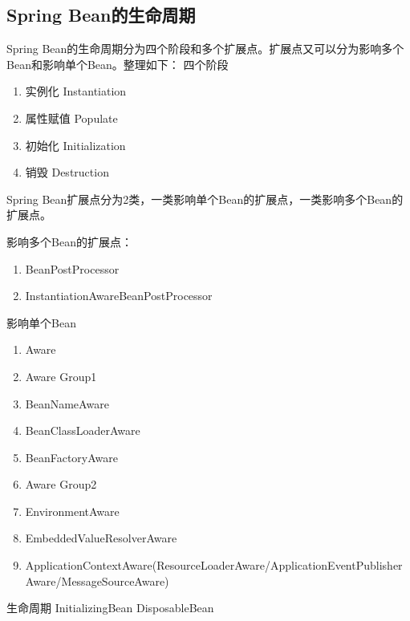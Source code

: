 \documentclass[../../../interview-questions.tex]{subfiles}
\begin{document}
\subsection{Spring Bean的生命周期}

Spring Bean的生命周期分为四个阶段和多个扩展点。扩展点又可以分为影响多个Bean和影响单个Bean。整理如下：
四个阶段

\begin{enumerate}
    \item {实例化 Instantiation}
    \item {属性赋值 Populate}
    \item {初始化 Initialization}
    \item {销毁 Destruction}
\end{enumerate}

Spring Bean扩展点分为2类，一类影响单个Bean的扩展点，一类影响多个Bean的扩展点。

影响多个Bean的扩展点：

\begin{enumerate}
    \item{BeanPostProcessor}
    \item {InstantiationAwareBeanPostProcessor}
\end{enumerate}

影响单个Bean

\begin{enumerate}
    \item {Aware}
    \item {Aware Group1}
    \item {BeanNameAware}
    \item {BeanClassLoaderAware}
    \item {BeanFactoryAware}
    \item {Aware Group2}
    \item {EnvironmentAware}
    \item {EmbeddedValueResolverAware}
    \item {ApplicationContextAware(ResourceLoaderAware/ApplicationEventPublisherAware/MessageSourceAware)}
\end{enumerate}

生命周期
InitializingBean
DisposableBean
\end{document}
